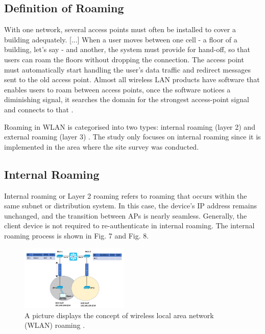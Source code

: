 \documentclass[conference]{IEEEtran}
\begin{document}
\subsection{Definition of Roaming}

With one network, several access points must often be installed to cover a building adequately. [...] When a user moves between one cell - a floor of a building, let's say - and another, the system must provide for hand-off, so that users can roam the floors without dropping the connection. The access point must automatically start handling the user's data traffic and redirect messages sent to the old access point. Almost all wireless LAN products have software that enables users to roam between access points, once the software notices a diminishing signal, it searches the domain for the strongest access-point signal and connects to that \cite{wickelgren1996}.

Roaming in WLAN is categorised into two types: internal roaming (layer 2) and external roaming (layer 3) \cite{wiki_roaming}. The study only focuses on internal roaming since it is implemented in the area where the site survey was conducted.

\subsection{Internal Roaming}

Internal roaming or Layer 2 roaming  refers to roaming that occurs within the same subnet or distribution system. In this case, the device’s IP address remains unchanged, and the transition between APs is nearly seamless. Generally, the client device is not required to re-authenticate in internal roaming. The internal roaming process is shown in Fig. 7 and Fig. 8.

\begin{figure}[htbp]
    \centering
    \includegraphics[width=0.46\textwidth]{fig7_internal_roaming.png}
    \caption{A picture displays the concept of wireless local area network (WLAN) roaming \cite{study_ccnp}.}
\end{figure}
\end{document}
